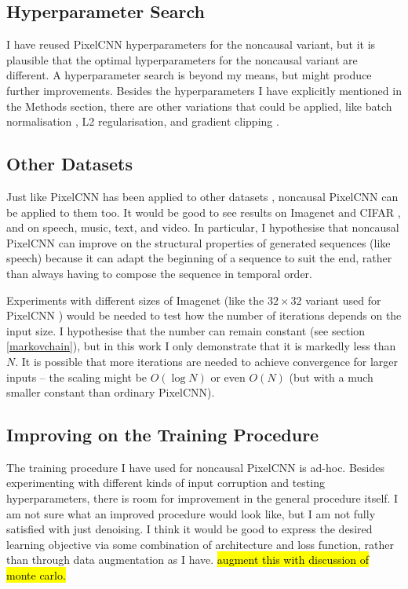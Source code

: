 \documentclass[11pt, a4paper]{book}
\begin{document}
\subsection{Hyperparameter Search}

I have reused PixelCNN hyperparameters for the noncausal variant, but it is plausible that the optimal hyperparameters for the noncausal variant are different. A hyperparameter search is beyond my means, but might produce further improvements. Besides the hyperparameters I have explicitly mentioned in the Methods section, there are other variations that could be applied, like batch normalisation \citep{batchnormalisation}, L2 regularisation, and gradient clipping \citep{gradientclipping}.

\subsection{Other Datasets}

Just like PixelCNN has been applied to other datasets \citep{pixelcnn2,wavenet,bytenet,videopixel}, noncausal PixelCNN can be applied to them too. It would be good to see results on Imagenet \citep{imagenet} and CIFAR \citep{cifar}, and on speech, music, text, and video. In particular, I hypothesise that noncausal PixelCNN can improve on the structural properties of generated sequences (like speech) because it can adapt the beginning of a sequence to suit the end, rather than always having to compose the sequence in temporal order.

Experiments with different sizes of Imagenet (like the $32\times 32$ variant used for PixelCNN \citep{pixelcnn2}) would be needed to test how the number of iterations depends on the input size. I hypothesise that the number can remain constant (see section \ref{markovchain}), but in this work I only demonstrate that it is markedly less than $N$. It is possible that more iterations are needed to achieve convergence for larger inputs -- the scaling might be $O(\log{N})$ or even $O(N)$ (but with a much smaller constant than ordinary PixelCNN).

\subsection{Improving on the Training Procedure}

The training procedure I have used for noncausal PixelCNN is ad-hoc. Besides experimenting with different kinds of input corruption and testing hyperparameters, there is room for improvement in the general procedure itself. I am not sure what an improved procedure would look like, but I am not fully satisfied with just denoising. I think it would be good to express the desired learning objective via some combination of architecture and loss function, rather than through data augmentation as I have. \hl{augment this with discussion of monte carlo.}
\end{document}
